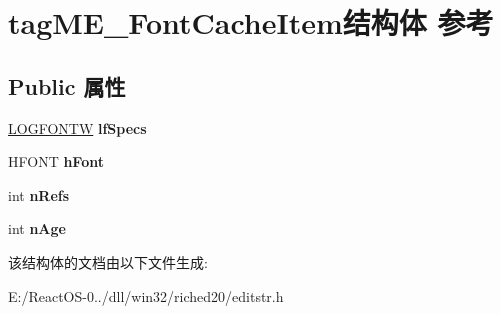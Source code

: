 \hypertarget{structtag_m_e___font_cache_item}{}\section{tag\+M\+E\+\_\+\+Font\+Cache\+Item结构体 参考}
\label{structtag_m_e___font_cache_item}
\subsection*{Public 属性}
\begin{DoxyCompactItemize}
\item 
\mbox{\label{structtag_m_e___font_cache_item_aea453be65d7243d06344a5283fe9915c}} 
\hyperlink{struct_l_o_g_f_o_n_t_w}{L\+O\+G\+F\+O\+N\+TW} {\bfseries lf\+Specs}
\item 
\mbox{\label{structtag_m_e___font_cache_item_a4537c06aad85b24c0e807ed9cdbe3d76}} 
H\+F\+O\+NT {\bfseries h\+Font}
\item 
\mbox{\label{structtag_m_e___font_cache_item_a93b71529d86ded3ce720113bf7fb9e78}} 
int {\bfseries n\+Refs}
\item 
\mbox{\label{structtag_m_e___font_cache_item_a00dea8af977d998215e64051ff5525db}} 
int {\bfseries n\+Age}
\end{DoxyCompactItemize}


该结构体的文档由以下文件生成\+:\begin{DoxyCompactItemize}
\item 
E\+:/\+React\+O\+S-\/0../dll/win32/riched20/editstr.\+h\end{DoxyCompactItemize}
